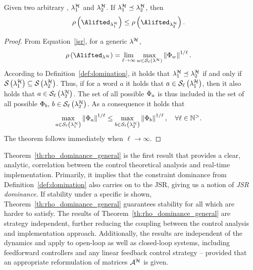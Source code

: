\begin{theorem}%
    \label{th:rho_dominance_general}%
    Given two arbitrary \ewhc{}, $\lambda_1^{\mathcal{H}}$ and $\lambda_2^{\mathcal{H}}$.
    If $\lambda_1^{\mathcal{H}} \preceq \lambda_2^{\mathcal{H}}$, then
    \begin{equation*}
        \rho\funof{\Alifted_{\lambda_1^\strat}} \leq \rho\funof{\Alifted_{\lambda_2^\strat}}.
    \end{equation*}

    \begin{proof}
        From Equation~\eqref{jsr}, for a generic \ewhc{} $\lambda^{\mathcal{H}}$,
        \begin{equation*}
            \rho\funof{\Alifted_{\lambda^\strat}} = \lim_{\ell\rightarrow \infty} \max_{w \in \sset{\ell}{\lambda^\strat}}\norm{\clmat{}_{w}}^{1/\ell}.
        \end{equation*}
        According to Definition~\ref{def:domination}, it holds that $\lambda^{\mathcal{H}}_1 \preceq \lambda^{\mathcal{H}}_2$ if and only if $\mathcal{S}_{}\left( \lambda^{\mathcal{H}}_1 \right) \subseteq \mathcal{S}_{}\left( \lambda^{\mathcal{H}}_2 \right)$.
        Thus, if for a word $a$ it holds that $a \in \mathcal{S}_{\ell}\left( \lambda^{\mathcal{H}}_1 \right)$, then it also holds that $a \in \mathcal{S}_{\ell}\left( \lambda^{\mathcal{H}}_2 \right)$.
        The set of all possible $\Phi{}_{a}$ is thus included in the set of all possible $\Phi{}_{b},\, b \in \mathcal{S}_{\ell}\left( \lambda^{\mathcal{H}}_2 \right)$.
        As a consequence it holds that
        \begin{equation*}
            \max_{a \in \mathcal{S}_{\ell}\left( \lambda^{\mathcal{H}}_1 \right)}\left\lVert\Phi{}_{a}\right\rVert^{1/\ell} \leq
            \max_{b \in \mathcal{S}_{\ell}\left( \lambda^{\mathcal{H}}_2 \right)}\left\lVert\Phi{}_{b}\right\rVert^{1/\ell}, \quad
            \forall \ell\in\mathbb{N}^{>}.
        \end{equation*}
        The theorem follows immediately when $\ell\rightarrow \infty$.
    \end{proof}
\end{theorem}

Theorem~\ref{th:rho_dominance_general} is the first result that provides a clear, analytic, correlation between the control theoretical analysis and real-time implementation.
Primarily, it implies that the constraint dominance from Definition~\ref{def:domination} also carries on to the JSR, giving us a notion of \emph{JSR dominance}.
If stability under a specific \ewhc{} is shown, Theorem~\ref{th:rho_dominance_general} guarantees stability for all \ewhc{} which are harder to satisfy.
The results of Theorem~\ref{th:rho_dominance_general} are strategy independent, further reducing the coupling between the control analysis and implementation approach.
Additionally, the results are independent of the dynamics and apply to open-loop as well as closed-loop systems, including feedforward controllers and any linear feedback control strategy -- provided that an appropriate reformulation of matrices $\mathcal{A}^{\mathcal{H}}$ is given.

